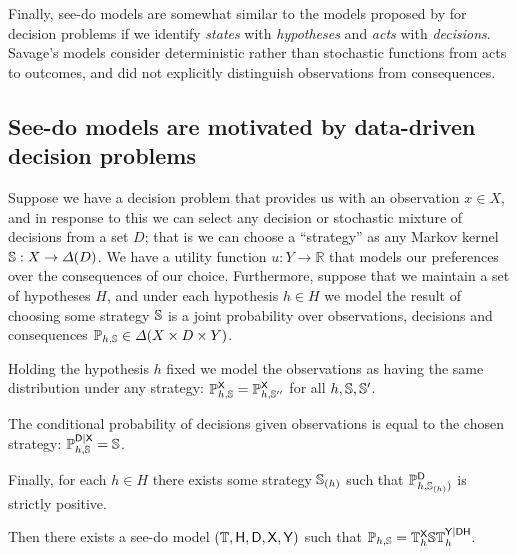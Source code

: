 Finally, see-do models are somewhat similar to the models proposed by \citet{savage_foundations_1954} for decision problems if we identify \emph{states} with \emph{hypotheses} and \emph{acts} with \emph{decisions}. Savage's models consider deterministic rather than stochastic functions from acts to outcomes, and did not explicitly distinguish observations from consequences.

\subsection{See-do models are motivated by data-driven decision problems} 


Suppose we have a decision problem that provides us with an observation $x\in X$, and in response to this we can select any decision or stochastic mixture of decisions from a set $D$; that is we can choose a ``strategy'' as any Markov kernel $\mathbb{S}:X\to \Delta(D)$. We have a utility function $u:Y\to \mathbb{R}$ that models our preferences over the consequences of our choice. Furthermore, suppose that we maintain a set of hypotheses $H$, and under each hypothesis $h\in H$ we model the result of choosing some strategy $\mathbb{S}$ is a joint probability over observations, decisions and consequences $\mathbb{P}_{h,\mathbb{S}}\in \Delta(X\times D\times Y)$.

Holding the hypothesis $h$ fixed we model the observations as having the same distribution under any strategy: $\mathbb{P}_{h,\mathbb{S}}^{\mathsf{X}}=\mathbb{P}_{h,\mathbb{S}''}^{\mathsf{X}}$ for all $h,\mathbb{S},\mathbb{S}'$.

The conditional probability of decisions given observations is equal to the chosen strategy: $\mathbb{P}_{h,\mathbb{S}}^{\mathsf{D}|\mathsf{X}}=\mathbb{S}$.

Finally, for each $h\in H$ there exists some strategy $\mathbb{S}_{(h)}$ such that $\mathbb{P}_{h,\mathbb{S}_{(h)})}^{\mathsf{D}}$ is strictly positive.

Then there exists a see-do model $(\mathbb{T},\mathsf{H},\mathsf{D},\mathsf{X},\mathsf{Y})$ such that $\mathbb{P}_{h,\mathbb{S}} = \mathbb{T}^{\mathsf{X}}_{h} \mathbb{S} \mathbb{T}^{\mathsf{Y}|\mathsf{DH}}_{h}$.
